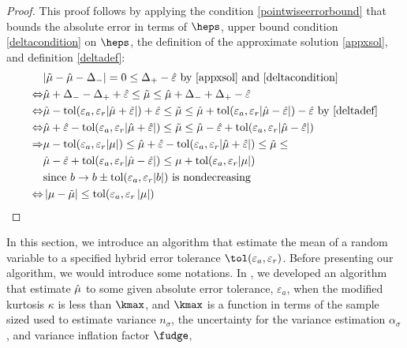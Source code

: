 \documentclass{iitthesis}
\begin{document}
 \begin{proof}
 This proof follows by applying the condition \eqref{pointwiseerrorbound}  that bounds the absolute error in terms of $\heps$, upper bound condition \eqref{deltacondition} on $\heps$, the definition of the approximate solution \eqref{appxsol}, and definition \eqref{deltadef}:
\begin{align*}
&|\tilde{\mu} -\hat{\mu} - \Delta_{-}| = 0 \leq \Delta_{+}- \hat{\varepsilon}  \text{ by } \eqref{appxsol} \text{ and } \eqref{deltacondition} \\ 
\Leftrightarrow 
&\hat{\mu}+\Delta_- - \Delta_{+} + \hat{\varepsilon} \leq \tilde{\mu}  \leq \hat{\mu} +\Delta_{-}+\Delta_{+}-\hat{\varepsilon} \\ \Leftrightarrow 
&\hat{\mu} -\text{tol} (\varepsilon_a, \varepsilon_r |\hat{\mu} +\hat{\varepsilon}|)+ \hat{\varepsilon} \leq \tilde{\mu}  \leq \hat{\mu}  +\text{tol} (\varepsilon_a, \varepsilon_r |\hat{\mu} -\hat{\varepsilon} |)-\hat{\varepsilon}  \text{ by } \eqref{deltadef}\\
\Leftrightarrow 
&\hat{\mu} + \hat{\varepsilon}  -\text{tol} (\varepsilon_a, \varepsilon_r |\hat{\mu} +\hat{\varepsilon} |) \leq \tilde{\mu}  \leq \hat{\mu} -\hat{\varepsilon} +\text{tol} (\varepsilon_a, \varepsilon_r |\hat{\mu} -\hat{\varepsilon} |) \\
\Rightarrow &
\mu -\text{tol} (\varepsilon_a, \varepsilon_r |\mu|) \leq\hat{\mu} + \hat{\varepsilon}  -\text{tol} (\varepsilon_a, \varepsilon_r |\hat{\mu} +\hat{\varepsilon} |) \leq \tilde{\mu}  \leq \\
& \hat{\mu} -\hat{\varepsilon} +\text{tol} (\varepsilon_a, \varepsilon_r |\hat{\mu} -\hat{\varepsilon} |)  \leq \mu+\text{tol} (\varepsilon_a, \varepsilon_r |\mu|) \\
& \text{since } b \to b \pm \text{tol} (\varepsilon_a,\varepsilon_r |b|) \text{ is nondecreasing}\\ 
\Leftrightarrow &
\left \lvert \mu-\tilde{\mu} \right \rvert \leq \text{tol} (\varepsilon_a, \varepsilon_r \left \lvert \mu \right \rvert) 
\end{align*}
\end{proof}
In this section, we introduce an algorithm that estimate the mean of a random variable to a specified hybrid error tolerance $\tol(\varepsilon_a, \varepsilon_r)$. Before presenting our algorithm, we would introduce some notations. In \cite{HJLO12}, we developed an algorithm that estimate $\hat{\mu}$ to some given absolute error tolerance, $\varepsilon_a$, when the modified kurtosis $\kappa$ is less than $\kmax$, and $\kmax$ is a function in terms of the sample sized used to estimate variance $n_\sigma$, the uncertainty for the variance estimation $\alpha_\sigma$, and variance inflation factor $\fudge$,
\end{document}
